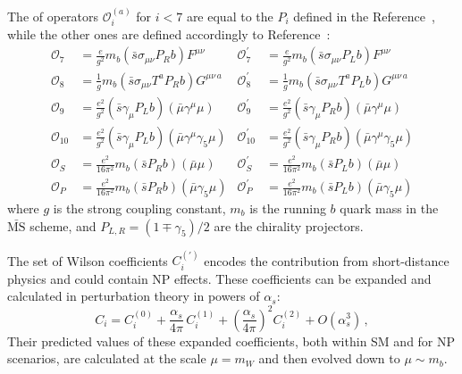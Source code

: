 The of operators $\mathcal O_i^{(a)}$ for $i<7$ are equal to the $P_i$ defined in the Reference~\cite{Bobeth:1999mk}, while the other ones are defined accordingly to Reference~\cite{Altmannshofer:2008dz}:
\begin{align}
  {\mathcal{O}}_{7} &= \frac{e}{g^2} m_b (\bar{s} \sigma_{\mu \nu} P_R b) F^{\mu \nu} &
  {\mathcal{O}}_{7}^\prime &= \frac{e}{g^2} m_b (\bar{s} \sigma_{\mu \nu} P_L b) F^{\mu \nu} \label{eq:O7}\\
  {\mathcal{O}}_{8} &= \frac{1}{g} m_b (\bar{s} \sigma_{\mu \nu} T^a P_R b) G^{\mu \nu \, a} &
  {\mathcal{O}}_{8}^\prime &= \frac{1}{g} m_b (\bar{s} \sigma_{\mu \nu} T^a P_L b) G^{\mu \nu \, a} \label{eq:O8}\\
  {\mathcal{O}}_{9} &= \frac{e^2}{g^2} (\bar{s} \gamma_{\mu} P_L b)(\bar{\mu} \gamma^\mu \mu) &
  {\mathcal{O}}_{9}^\prime &= \frac{e^2}{g^2} (\bar{s} \gamma_{\mu} P_R b)(\bar{\mu} \gamma^\mu \mu) \label{eq:O9}\\
  {\mathcal{O}}_{10} &=\frac{e^2}{g^2} (\bar{s}  \gamma_{\mu} P_L b)(\bar{\mu} \gamma^\mu \gamma_5 \mu) &
  {\mathcal{O}}_{10}^\prime &=\frac{e^2}{g^2} (\bar{s}  \gamma_{\mu} P_R b)(\bar{\mu} \gamma^\mu \gamma_5 \mu) \label{eq:O10}\\
  {\mathcal{O}}_{S} &=\frac{e^2}{16\pi^2} m_b (\bar{s} P_R b)(\bar{\mu} \mu) &
  {\mathcal{O}}_{S}^\prime &=\frac{e^2}{16\pi^2} m_b (\bar{s} P_L b)(\bar{\mu} \mu) \label{eq:OS}\\
  {\mathcal{O}}_{P} &=\frac{e^2}{16\pi^2} m_b (\bar{s} P_R b)(\bar{\mu} \gamma_5 \mu) &
  {\mathcal{O}}_{P}^\prime &=\frac{e^2}{16\pi^2} m_b (\bar{s} P_L b)(\bar{\mu} \gamma_5 \mu) \label{eq:OP}
\end{align}
where $g$ is the strong coupling constant, $m_b$ is the running $b$ quark mass in the $\bar{\mathrm{MS}}$ scheme, and $P_{L,R}=(1\mp\gamma_5)/2$ are the chirality projectors.

The set of Wilson coefficients $C^{(\prime)}_i$ encodes the contribution from short-distance physics and could contain NP effects.
These coefficients can be expanded and calculated in perturbation theory in powers of $\alpha_s$:
\begin{equation}\label{WilExpansion}
  C_i = C_i^{(0)} + \frac{\alpha_s}{4\pi}\, C_i^{(1)} + \left(\frac{\alpha_s}{4\pi}\right)^2 C_i^{(2)} + O(\alpha_s^3)\,,
\end{equation}
Their predicted values of these expanded coefficients, both within SM and for NP scenarios, are calculated at the scale $\mu=m_W$ and then evolved down to $\mu\sim m_b$.

